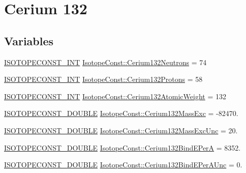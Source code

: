 \hypertarget{group___isotope_const-_cerium-_ce132}{}\section{Cerium 132}
\label{group___isotope_const-_cerium-_ce132}
\subsection*{Variables}
\begin{DoxyCompactItemize}
\item 
\mbox{\hyperlink{group___isotope_const-_macros_ga5f18360b3e99483a35c32d789e62621c}{I\+S\+O\+T\+O\+P\+E\+C\+O\+N\+S\+T\+\_\+\+I\+NT}} \mbox{\hyperlink{group___isotope_const-_cerium-_ce132_ga13814acc2b7df149434adcceb211e281}{Isotope\+Const\+::\+Cerium132\+Neutrons}} = 74
\item 
\mbox{\hyperlink{group___isotope_const-_macros_ga5f18360b3e99483a35c32d789e62621c}{I\+S\+O\+T\+O\+P\+E\+C\+O\+N\+S\+T\+\_\+\+I\+NT}} \mbox{\hyperlink{group___isotope_const-_cerium-_ce132_ga794a9421282067b0f8c36e22efdc3831}{Isotope\+Const\+::\+Cerium132\+Protons}} = 58
\item 
\mbox{\hyperlink{group___isotope_const-_macros_ga5f18360b3e99483a35c32d789e62621c}{I\+S\+O\+T\+O\+P\+E\+C\+O\+N\+S\+T\+\_\+\+I\+NT}} \mbox{\hyperlink{group___isotope_const-_cerium-_ce132_ga9fec2fe23552da3224e3db2f9a41ddb2}{Isotope\+Const\+::\+Cerium132\+Atomic\+Weight}} = 132
\item 
\mbox{\hyperlink{group___isotope_const-_macros_ga8f45a7272ce02c0b4c65c44636ed719a}{I\+S\+O\+T\+O\+P\+E\+C\+O\+N\+S\+T\+\_\+\+D\+O\+U\+B\+LE}} \mbox{\hyperlink{group___isotope_const-_cerium-_ce132_ga4933c0d435a8569534b21c4230b3c50c}{Isotope\+Const\+::\+Cerium132\+Mass\+Exc}} = -\/82470.
\item 
\mbox{\hyperlink{group___isotope_const-_macros_ga8f45a7272ce02c0b4c65c44636ed719a}{I\+S\+O\+T\+O\+P\+E\+C\+O\+N\+S\+T\+\_\+\+D\+O\+U\+B\+LE}} \mbox{\hyperlink{group___isotope_const-_cerium-_ce132_ga74a15ee3e145c416a19643ae8ef03666}{Isotope\+Const\+::\+Cerium132\+Mass\+Exc\+Unc}} = 20.
\item 
\mbox{\hyperlink{group___isotope_const-_macros_ga8f45a7272ce02c0b4c65c44636ed719a}{I\+S\+O\+T\+O\+P\+E\+C\+O\+N\+S\+T\+\_\+\+D\+O\+U\+B\+LE}} \mbox{\hyperlink{group___isotope_const-_cerium-_ce132_ga39536681ac9b32c5a7bb49e47ea77135}{Isotope\+Const\+::\+Cerium132\+Bind\+E\+PerA}} = 8352.
\item 
\mbox{\hyperlink{group___isotope_const-_macros_ga8f45a7272ce02c0b4c65c44636ed719a}{I\+S\+O\+T\+O\+P\+E\+C\+O\+N\+S\+T\+\_\+\+D\+O\+U\+B\+LE}} \mbox{\hyperlink{group___isotope_const-_cerium-_ce132_ga31378e3efb89eb2fcc0f8f2c0b35b142}{Isotope\+Const\+::\+Cerium132\+Bind\+E\+Per\+A\+Unc}} = 0.

\end{DoxyCompactItemize}
